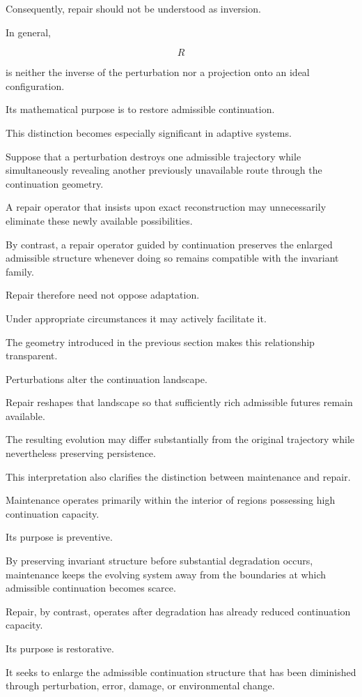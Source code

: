 \documentclass[11pt]{book}
\numberwithin{equation}{chapter}
\theoremstyle{definition}
\theoremstyle{plain}
\begin{document}
Consequently, repair should not be understood as inversion.

In general,

\[
R
\]

is neither the inverse of the perturbation nor a projection onto an ideal configuration.

Its mathematical purpose is to restore admissible continuation.

This distinction becomes especially significant in adaptive systems.

Suppose that a perturbation destroys one admissible trajectory while simultaneously revealing another previously unavailable route through the continuation geometry.

A repair operator that insists upon exact reconstruction may unnecessarily eliminate these newly available possibilities.

By contrast, a repair operator guided by continuation preserves the enlarged admissible structure whenever doing so remains compatible with the invariant family.

Repair therefore need not oppose adaptation.

Under appropriate circumstances it may actively facilitate it.

The geometry introduced in the previous section makes this relationship transparent.

Perturbations alter the continuation landscape.

Repair reshapes that landscape so that sufficiently rich admissible futures remain available.

The resulting evolution may differ substantially from the original trajectory while nevertheless preserving persistence.

This interpretation also clarifies the distinction between maintenance and repair.

Maintenance operates primarily within the interior of regions possessing high continuation capacity.

Its purpose is preventive.

By preserving invariant structure before substantial degradation occurs, maintenance keeps the evolving system away from the boundaries at which admissible continuation becomes scarce.

Repair, by contrast, operates after degradation has already reduced continuation capacity.

Its purpose is restorative.

It seeks to enlarge the admissible continuation structure that has been diminished through perturbation, error, damage, or environmental change.
\end{document}
